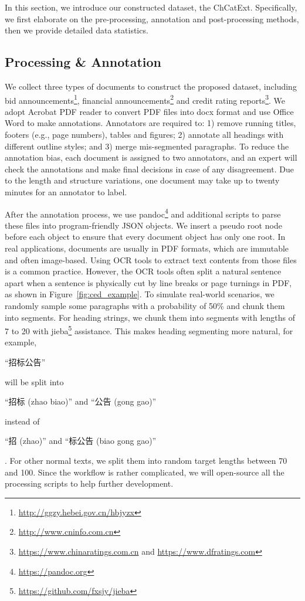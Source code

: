 \documentclass[runningheads]{llncs}
\begin{document}
In this section, we introduce our constructed dataset, the ChCatExt.
Specifically, we first elaborate on the pre-processing, annotation and post-processing methods, then we provide detailed data statistics.

\subsection{Processing \& Annotation}

We collect three types of documents to construct the proposed dataset, including bid announcements\footnote{\url{http://ggzy.hebei.gov.cn/hbjyzx}}, financial announcements\footnote{\url{http://www.cninfo.com.cn}} and credit rating reports\footnote{\url{https://www.chinaratings.com.cn} and \url{https://www.dfratings.com}}.
We adopt Acrobat PDF reader to convert PDF files into docx format and use Office Word to make annotations.
Annotators are required to: 
1) remove running titles, footers (e.g., page numbers), tables and figures;
2) annotate all headings with different outline styles;
and 3) merge mis-segmented paragraphs.
To reduce the annotation bias, each document is assigned to two annotators, and an expert will check the annotations and make final decisions in case of any disagreement.
Due to the length and structure variations, one document may take up to twenty minutes for an annotator to label.

After the annotation process, we use pandoc\footnote{\url{https://pandoc.org}} and additional scripts to parse these files into program-friendly JSON objects.
We insert a pseudo root node before each object to ensure that every document object has only one root.
In real applications, documents are usually in PDF formats, which are immutable and often image-based.
Using OCR tools to extract text contents from those files is a common practice.
However, the OCR tools often split a natural sentence apart when a sentence is physically cut by line breaks or page turnings in PDF, as shown in Figure~\ref{fig:ced_example}.
To simulate real-world scenarios, we randomly sample some paragraphs with a probability of 50\% and chunk them into segments.
For heading strings, we chunk them into segments with lengths of 7 to 20 with jieba\footnote{\url{https://github.com/fxsjy/jieba}} assistance.
This makes heading segmenting more natural, for example, \begin{CJK}{UTF8}{gbsn} ``招标公告'' \end{CJK} will be split into \begin{CJK}{UTF8}{gbsn} ``招标 (zhao biao)'' and ``公告 (gong gao)'' \end{CJK} instead of \begin{CJK}{UTF8}{gbsn} ``招 (zhao)'' and ``标公告 (biao gong gao)'' \end{CJK}.
For other normal texts, we split them into random target lengths between 70 and 100.
Since the workflow is rather complicated, we will open-source all the processing scripts to help further development.
\end{document}
